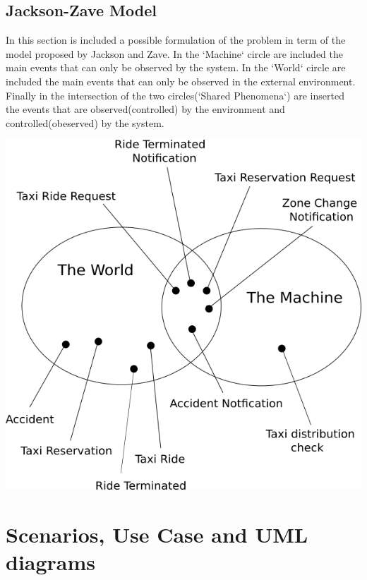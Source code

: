 \documentclass[11pt,titlepage]{article} %
\begin{document}
    \subsection{Jackson-Zave Model}
        In this section is included a possible formulation of the problem in term of the model proposed by Jackson and Zave.\newline
        In the `Machine` circle are included the main events that can only be observed by the system.\newline
        In the `World` circle are included the main events that can only be observed in the external environment.\newline
        Finally in the intersection of the two circles(`Shared Phenomena`) are inserted the events that are observed(controlled) by the
        environment and controlled(obeserved) by the system.\newline
        \begin{center}
         \includegraphics[scale=0.48]{jz.png}
        \end{center}
        

\section {Scenarios, Use Case and UML diagrams}
\end{document}
